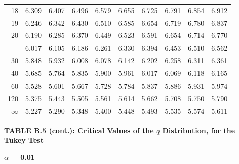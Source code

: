 \documentclass[10pt]{article}
\begin{document}
\begin{longtable}{@{}r!{\vrule width 0.8pt\hspace{0.55em}}rrrrrrrrr@{}}
18 & 6.309 & 6.407 & 6.496 & 6.579 & 6.655 & 6.725 & 6.791 & 6.854 & 6.912 \\
19 & 6.246 & 6.342 & 6.430 & 6.510 & 6.585 & 6.654 & 6.719 & 6.780 & 6.837 \\
20 & 6.190 & 6.285 & 6.370 & 6.449 & 6.523 & 6.591 & 6.654 & 6.714 & 6.770 \\
 & 6.017 & 6.105 & 6.186 & 6.261 & 6.330 & 6.394 & 6.453 & 6.510 & 6.562 \\
30 & 5.848 & 5.932 & 6.008 & 6.078 & 6.142 & 6.202 & 6.258 & 6.311 & 6.361 \\
40 & 5.685 & 5.764 & 5.835 & 5.900 & 5.961 & 6.017 & 6.069 & 6.118 & 6.165 \\
60 & 5.528 & 5.601 & 5.667 & 5.728 & 5.784 & 5.837 & 5.886 & 5.931 & 5.974 \\
120 & 5.375 & 5.443 & 5.505 & 5.561 & 5.614 & 5.662 & 5.708 & 5.750 & 5.790 \\
\addlinespace[0.30em]
$\infty$ & 5.227 & 5.290 & 5.348 & 5.400 & 5.448 & 5.493 & 5.535 & 5.574 & 5.611 \\
\end{longtable}
\newpage
\thispagestyle{empty}
\begin{center}
{\large\bfseries TABLE B.5 (cont.): Critical Values of the $q$ Distribution, for the Tukey Test\par}
\end{center}
{\large\bfseries $\alpha$ = 0.01\par}
\vspace{0.45em}
\small
\end{document}
